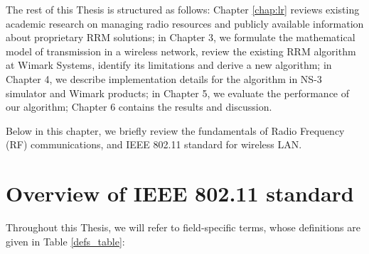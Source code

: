 The rest of this Thesis is structured as follows: Chapter \ref{chap:lr} reviews existing academic research on managing radio resources and publicly available information about proprietary RRM solutions; in Chapter 3, we formulate the mathematical model of transmission in a wireless network, review the existing RRM algorithm at Wimark Systems, identify its limitations and derive a new algorithm; in Chapter 4, we describe implementation details for the algorithm in NS-3 simulator and Wimark products; in Chapter 5, we evaluate the performance of our algorithm; Chapter 6 contains the results and discussion.



Below in this chapter, we briefly review the fundamentals of Radio Frequency (RF) communications, and IEEE 802.11 standard for wireless LAN.

\section{Overview of IEEE 802.11 standard}

Throughout this Thesis, we will refer to field-specific terms, whose definitions are given in Table \ref{defs_table}:

